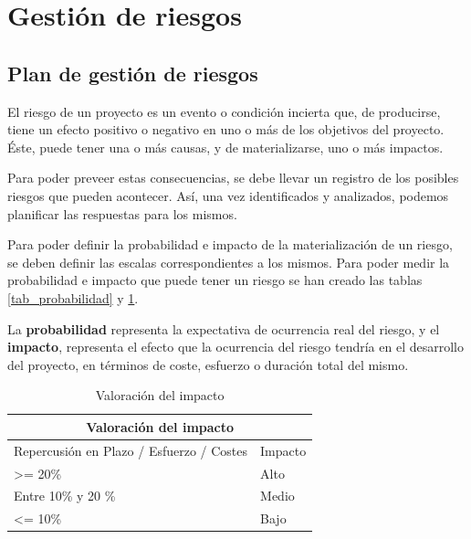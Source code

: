 
\section{Gestión de riesgos}

\subsection{Plan de gestión de riesgos}
El riesgo de un proyecto es un evento o condición incierta que, de producirse, tiene un efecto positivo o negativo en uno o más de los objetivos del proyecto. Éste, puede tener una o más causas, y de materializarse, uno o más impactos\cite{pmbok}.


Para poder preveer estas consecuencias, se debe llevar un registro de los posibles riesgos que pueden acontecer. Así, una vez identificados y analizados, podemos planificar las respuestas para los mismos.


Para poder definir la probabilidad e impacto de la materialización de un riesgo, se deben definir las escalas correspondientes a los mismos. Para poder medir la probabilidad e impacto que puede tener un riesgo se han creado las tablas \ref{tab_probabilidad} y \ref{tab_impacto}.


La \textbf{probabilidad} representa la expectativa de ocurrencia real del riesgo, y el \textbf{impacto}, representa el efecto que la ocurrencia del riesgo tendría en el desarrollo del proyecto, en términos de coste, esfuerzo o duración total del mismo. 

\begin{table}[htpb]
\centering
\begin{tabular}{|l|l|}
\hline
\multicolumn{2}{|c|}{Valoración del impacto}                                                  \\ \hline
\multicolumn{1}{|c|}{Repercusión en Plazo / Esfuerzo / Costes} & \multicolumn{1}{c|}{Impacto} \\ \hline
\textgreater= 20\%                                             & Alto                         \\ \hline
Entre 10\% y 20 \%                                             & Medio                        \\ \hline
\textless= 10\%                                                & Bajo                         \\ \hline
\end{tabular}
\caption{Valoración del impacto}
\label{tab_impacto}
\end{table}

